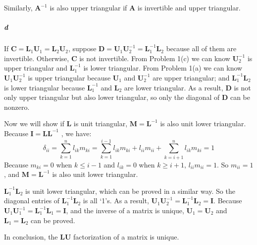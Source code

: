 \documentclass[22pt]{article}
\begin{document}
		Similarly, $\mathbf{A}^{-1}$ is also upper triangular if $\mathbf{A}$ is invertible and upper triangular.

		\subparagraph{d} If $\mathbf{C} = \mathbf{L}_1\mathbf{U}_1 = \mathbf{L}_2\mathbf{U}_2$, suppose $\mathbf{D} = \mathbf{U}_1\mathbf{U}_2^{-1} = \mathbf{L}_1^{-1}\mathbf{L}_2$ because all of them are invertible. Otherwise, $\mathbf{C}$ is not invertible. From Problem 1(c) we can know $\mathbf{U}_2^{-1}$ is upper triangular and $\mathbf{L}_1^{-1}$ is lower triangular. From Problem 1(a) we can know $\mathbf{U}_1\mathbf{U}_2^{-1}$ is upper triangular because $\mathbf{U}_1$ and $\mathbf{U}_2^{-1}$ are upper triangular; and $ \mathbf{L}_1^{-1}\mathbf{L}_2$ is lower triangular because $\mathbf{L}_1^{-1}$ and $\mathbf{L}_2$ are lower triangular. As a result, $\mathbf{D}$ is not only upper triangular but also lower triangular, so only the diagonal of $\mathbf{D}$ can be nonzero. 

		Now we will show if $\mathbf{L}$ is unit triangular, $\mathbf{M} = \mathbf{L}^{-1}$ is also unit lower triangular. Because $\mathbf{I} = \mathbf{LL}^{-1}$ , we have:
		\begin{equation}
			\delta_{ii} = \sum\limits_{k=1}^{n}l_{ik}m_{ki} =   \sum\limits_{k=1}^{i-1}l_{ik}m_{ki} + l_{ii}m_{ii} + \sum\limits_{k=i+1}^{n}l_{ik}m_{ki} = 1
		\end{equation}
		Because $m_{ki} = 0$ when $k \leq i-1$ and $l_{ik} = 0$ when $k\geq i+1$, $l_{ii}m_{ii} = 1$. So $m_{ii}=1$, and $\mathbf{M} = \mathbf{L}^{-1}$ is also unit lower triangular. 

		$ \mathbf{L}_1^{-1}\mathbf{L}_2$ is unit lower triangular, which can be proved in a similar way. So the diagonal entries of $ \mathbf{L}_1^{-1}\mathbf{L}_2$ is all `1's. As a result, $\mathbf{U}_1\mathbf{U}_2^{-1} = \mathbf{L}_1^{-1}\mathbf{L}_2 = \mathbf{I}$. Because $\mathbf{U}_1\mathbf{U}_1^{-1} = \mathbf{L}_1^{-1}\mathbf{L}_1 = \mathbf{I}$, and the inverse of a matrix is unique, $\mathbf{U}_1 = \mathbf{U}_2$ and $\mathbf{L}_1 = \mathbf{L}_2$ can be proved.

		In conclusion, the $\mathbf{LU}$ factorization of a matrix is unique.
\end{document}
